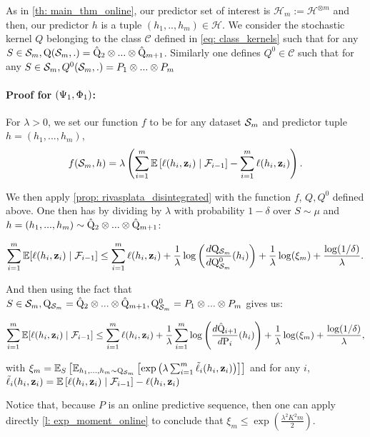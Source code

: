 \begin{noaddcontents}
As in \cref{th: main_thm_online}, our predictor set of interest is $\mathcal{H}_m:= \mathcal{H}^{\otimes m}$ and then, our predictor $h$ is a tuple $(h_1,..,h_m)\in\mathcal{H}$. We consider the stochastic kernel $Q$ belonging to the class $\mathcal{C}$ defined in \cref{eq: class_kernels} such that for any $S\in\mathcal{S}_m, \mathrm{Q}(\mathcal{S}_m,.) = \hat{\mathrm{Q}}_2\otimes ... \otimes \hat{\mathrm{Q}}_{m+1}$.
Similarly one defines $Q^0\in\mathcal{C}$ such that for any $S\in\mathcal{S}_m, Q^0(\mathcal{S}_m,.) = P_1\otimes ... \otimes P_{m}$




\paragraph{Proof for $(\Psi_{\normalfont1},\Phi_{\normalfont1})$:}

For $\lambda>0$, we set our function $f$ to be for any dataset $\mathcal{S}_m$ and predictor tuple $h=(h_1,...,h_m)$,
\[f(\mathcal{S}_m,h) = \lambda \left(\sum_{i=1}^m \mathbb{E}\left[\ell(h_i,\mathbf{z}_i)\mid \mathcal{F}_{i-1}\right]- \sum_{i=1}^m \ell(h_i,\mathbf{z}_i) \right).\]

We then apply \cref{prop: rivasplata_disintegrated} with the function $f$, $Q,Q^0$ defined above. One then has by dividing by $\lambda$ with probability $1-\delta$ over $S\sim \mu$ and $h=(h_1,...,h_m)\sim \hat{\mathrm{Q}}_2\otimes ... \otimes \hat{\mathrm{Q}}_{m+1}$:

\[ \sum_{i=1}^m  \mathbb{E}[\ell(h_i,\mathbf{z}_i) \mid \mathcal{F}_{i-1}]   \leq \sum_{i=1}^m  \ell(h_i,\mathbf{z}_i)  + \frac{1}{\lambda}\log\left(\frac{d\mathrm{Q}_{\mathcal{S}_m}}{d\mathrm{Q}_{\mathcal{S}_m}^0}(h_i)\right) + \frac{1}{\lambda} \log(\xi_m) + \frac{\log(1/\delta)}{\lambda}. \]

And then using the fact that $S\in\mathcal{S}_m, \mathrm{Q}_{\mathcal{S}_m} = \hat{\mathrm{Q}}_2\otimes ... \otimes \hat{\mathrm{Q}}_{m+1}, \mathrm{Q}_{\mathcal{S}_m}^0 = P_1\otimes ... \otimes P_{m}$ gives us:

\[ \sum_{i=1}^m  \mathbb{E}[\ell(h_i,\mathbf{z}_i) \mid \mathcal{F}_{i-1}]   \leq \sum_{i=1}^m  \ell(h_i,\mathbf{z}_i)  + \frac{1}{\lambda}\sum_{i=1}^m \log\left(\frac{d\hat{\mathrm{Q}}_{i+1}}{d\mathrm{P}_{i}}(h_i)\right) + \frac{1}{\lambda} \log(\xi_m) + \frac{\log(1/\delta)}{\lambda}, \]

with $  \xi_m = \mathbb{E}_S\left[\mathbb{E}_{h_1,...,h_m \sim \mathrm{Q}_{\mathcal{S}_m}} \left[\exp\left(\lambda \sum_{i=1}^m \Tilde{\ell}_i(h_i,\mathbf{z}_i)\right)\right]\right]$ and for any $i$,
$ \Tilde{\ell}_i(h_i,\mathbf{z}_i) = \mathbb{E}\left[\ell(h_i,\mathbf{z}_i)\mid \mathcal{F}_{i-1}\right]-  \ell(h_i,\mathbf{z}_i) $

Notice that, because $P$ is an online predictive sequence, then one can apply directly \cref{l: exp_moment_online} to conclude that $\xi_m \leq \exp \left( \frac{\lambda^2K^2m}{2} \right)$.


\end{noaddcontents}
